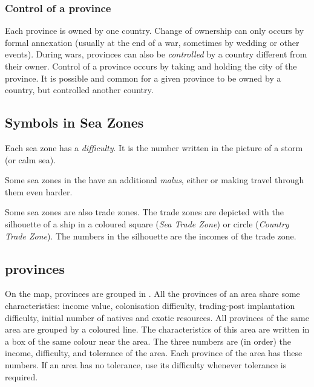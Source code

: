\subsubsection{Control of a province}
\aparag Each province is owned by one country.
\bparag Change of ownership can only occurs by formal annexation (usually at
the end of a war, sometimes by wedding or other events).
\aparag During wars, provinces can also be \emph{controlled} by a country
different from their owner.
\bparag Control of a province occurs by taking and holding the city of the
province.
\aparag It is possible and common for a given province to be owned by a
country, but controlled another country.



\subsection{Symbols in Sea Zones}

\aparag Each sea zone has a \emph{difficulty}. It is the number written in the
picture of a storm (or calm sea).

\aparag Some sea zones in the \ROTW have an additional \emph{malus}, either
 or  making travel through them even harder.

\aparag Some sea zones are also trade zones. The trade zones are depicted with
the silhouette of a ship in a coloured square (\emph{Sea Trade Zone}) or
circle (\emph{Country Trade Zone}).
\bparag The numbers in the silhouette are the incomes of the trade zone.



\subsection{\ROTW provinces}\label{chBasics:ROTW Areas}

\aparag On the \ROTW map, provinces are grouped in . All the
provinces of an area share some characteristics: income value, colonisation
difficulty, trading-post implantation difficulty, initial number of natives
and exotic resources.
\bparag All provinces of the same area are grouped by a coloured line. The
characteristics of this area are written in a box of the same colour near the
area.
\aparag The three numbers are (in order) the income, difficulty, and tolerance
of the area.
\bparag Each province of the area has these numbers.
\bparag If an area has no tolerance, use its difficulty whenever tolerance is
required.

